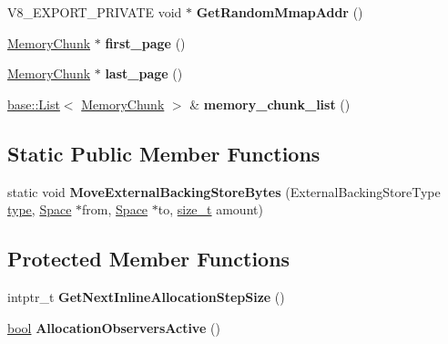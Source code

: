 \begin{DoxyCompactItemize}
V8\+\_\+\+E\+X\+P\+O\+R\+T\+\_\+\+P\+R\+I\+V\+A\+TE void $\ast$ {\bfseries Get\+Random\+Mmap\+Addr} ()
\item 
\mbox{\label{classv8_1_1internal_1_1Space_a94208293db2631ea056be7c45471f5cd}} 
\mbox{\hyperlink{classv8_1_1internal_1_1MemoryChunk}{Memory\+Chunk}} $\ast$ {\bfseries first\+\_\+page} ()
\item 
\mbox{\label{classv8_1_1internal_1_1Space_a6b97aa8fd9389143c59e36bbca75eca7}} 
\mbox{\hyperlink{classv8_1_1internal_1_1MemoryChunk}{Memory\+Chunk}} $\ast$ {\bfseries last\+\_\+page} ()
\item 
\mbox{\label{classv8_1_1internal_1_1Space_a649e7bef4280801ddbbc70b5b2fe4236}} 
\mbox{\hyperlink{classv8_1_1base_1_1List}{base\+::\+List}}$<$ \mbox{\hyperlink{classv8_1_1internal_1_1MemoryChunk}{Memory\+Chunk}} $>$ \& {\bfseries memory\+\_\+chunk\+\_\+list} ()
\end{DoxyCompactItemize}
\subsection*{Static Public Member Functions}
\begin{DoxyCompactItemize}
\item 
\mbox{\label{classv8_1_1internal_1_1Space_a0bb12027c2842ed45b62aaf6c21ea881}} 
static void {\bfseries Move\+External\+Backing\+Store\+Bytes} (External\+Backing\+Store\+Type \mbox{\hyperlink{classstd_1_1conditional_1_1type}{type}}, \mbox{\hyperlink{classv8_1_1internal_1_1Space}{Space}} $\ast$from, \mbox{\hyperlink{classv8_1_1internal_1_1Space}{Space}} $\ast$to, \mbox{\hyperlink{classsize__t}{size\+\_\+t}} amount)
\end{DoxyCompactItemize}
\subsection*{Protected Member Functions}
\begin{DoxyCompactItemize}
\item 
\mbox{\label{classv8_1_1internal_1_1Space_acbf2bdad84c14c8accec48a4b2d8a860}} 
intptr\+\_\+t {\bfseries Get\+Next\+Inline\+Allocation\+Step\+Size} ()
\item 
\mbox{\label{classv8_1_1internal_1_1Space_afbcff6b754d7a3dda35c2e639b6dc693}} 
\mbox{\hyperlink{classbool}{bool}} {\bfseries Allocation\+Observers\+Active} ()
\end{DoxyCompactItemize}
